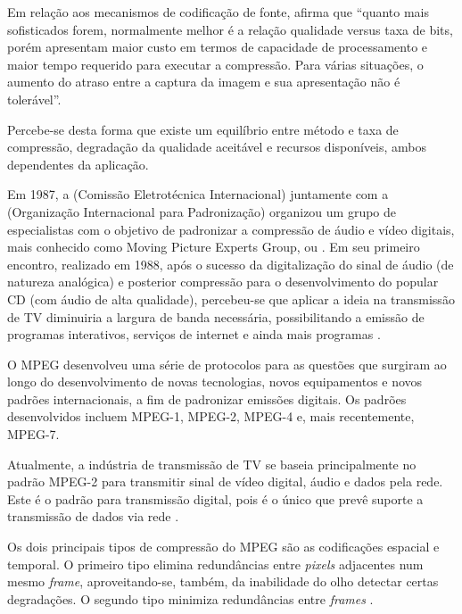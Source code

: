Em relação aos mecanismos de codificação de fonte, \cite{rehme} afirma que “quanto mais sofisticados forem, normalmente melhor é a relação qualidade versus taxa de bits, porém apresentam maior custo em termos de capacidade de processamento e maior tempo requerido para executar a compressão. Para várias situações, o aumento do atraso entre a captura da imagem e sua apresentação não é tolerável”.

Percebe-se desta forma que existe um equilíbrio entre método e taxa de compressão, degradação da qualidade aceitável e recursos disponíveis, ambos dependentes da aplicação.

Em 1987, a  (Comissão Eletrotécnica Internacional) juntamente com a  (Organização Internacional para Padronização) organizou um grupo de especialistas com o objetivo de padronizar a compressão de áudio e vídeo digitais, mais conhecido como Moving Picture Experts Group, ou . Em seu primeiro encontro, realizado em 1988, após o sucesso da digitalização do sinal de áudio (de natureza analógica) e posterior compressão para o desenvolvimento do popular CD (com áudio de alta qualidade), percebeu-se que aplicar a ideia na transmissão de TV diminuiria a largura de banda necessária, possibilitando a emissão de programas interativos, serviços de internet e ainda mais programas \cite{mpeg2ref}.

O MPEG desenvolveu uma série de protocolos para as questões que surgiram ao longo do desenvolvimento de novas tecnologias, novos equipamentos e novos padrões internacionais, a fim de padronizar emissões digitais. Os padrões desenvolvidos incluem MPEG-1, MPEG-2, MPEG-4 e, mais recentemente, MPEG-7.

Atualmente, a indústria de transmissão de TV se baseia principalmente no padrão MPEG-2 para transmitir sinal de vídeo digital, áudio e dados pela rede. Este é o padrão para transmissão digital, pois é o único que prevê suporte a transmissão de dados via rede \cite{mpeg2ref}.

Os dois principais tipos de compressão do MPEG são as codificações espacial e temporal. O primeiro tipo elimina redundâncias entre \emph{pixels} adjacentes num mesmo \emph{frame}, aproveitando-se, também, da inabilidade do olho detectar certas degradações. O segundo tipo minimiza redundâncias entre \emph{frames} \cite{mpeg2ref}.

